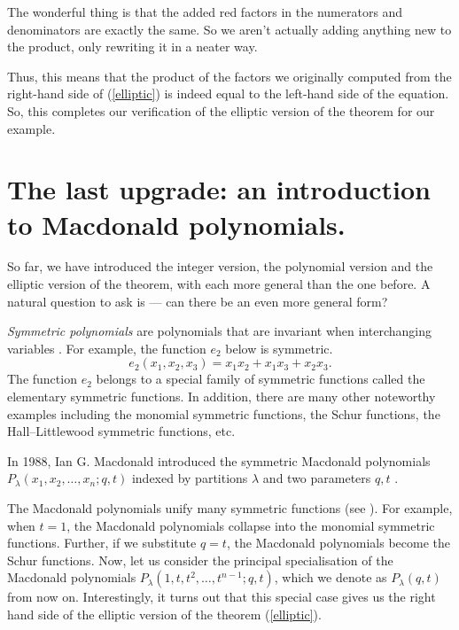\documentclass[a4paper,11pt]{amsart}
\begin{document}
		The wonderful thing is that the added red factors in the numerators and denominators are exactly the same. So we aren't actually adding anything new to the product, only rewriting it in a neater way.
		
		Thus, this means that the product of the factors we originally computed from the right-hand side of (\ref{elliptic}) is indeed equal to the left-hand side of the equation. So, this completes our verification of the elliptic version of the theorem for our example.
		
\section{The last upgrade: an introduction to Macdonald polynomials.}
		
		So far, we have introduced the integer version, the polynomial version and the elliptic version of the theorem, with each more general than the one before. A natural question to ask is --- can there be an even more general form?%
		
		\textit{Symmetric polynomials} are polynomials that are invariant when interchanging variables \cite[Ch.\ I §2]{MR1354144}. For example, the function $e_2$ below is symmetric.		\[e_2(x_1,x_2, x_3) = x_1x_2+x_1x_3+x_2x_3.\] The function $e_2$ belongs to a special family of symmetric functions called the elementary symmetric functions. In addition, there are many other noteworthy examples including the monomial symmetric functions, the Schur functions, the Hall–Littlewood symmetric functions, etc.

		In 1988, Ian G. Macdonald introduced the symmetric Macdonald polynomials $P_\lambda(x_1, x_2, \ldots, x_n ;q,t)$ indexed by partitions $\lambda$ and two parameters $q, t$ \cite{Macdonald88anew}.

		The Macdonald polynomials unify many symmetric functions (see \cite[Ch.\ I §11]{MR1488699}). For example, when $t=1$, the Macdonald polynomials collapse into the monomial symmetric functions. Further, if we substitute $q=t$, the Macdonald polynomials become the Schur functions. Now, let us consider the principal specialisation of the Macdonald polynomials $P_\lambda(1,t,t^2,\ldots, t^{n-1};q,t)$, which we denote as $P_\lambda(q,t)$ from now on. Interestingly, it turns out that this special case gives us the right hand side of the elliptic version of the theorem (\ref{elliptic}).
		
\end{document}
